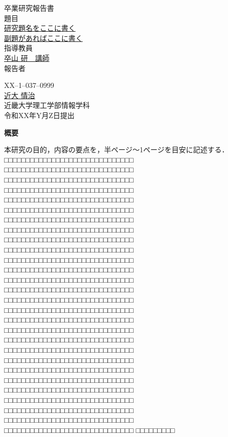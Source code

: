 \documentclass{jsarticle}
\begin{document}
\pagestyle{empty}

\begin{center}
\vspace*{1cm}
\large
{\LARGE 卒業研究報告書}\\
\vspace*{0.8cm}
題目\\
\vspace*{1cm}
{\Huge \underline{研究題名をここに書く}}\\
\vspace{3mm}
{\LARGE \underline{副題があればここに書く}}\\

\vspace*{3cm}
指導教員\\
\vspace*{0.3cm}
\underline{\LARGE 卒山 研　講師}\\
\vspace*{3cm}
報告者\\
\vspace*{0.3cm}

{XX--1--037--0999}\\
\vspace*{0.3cm}
\underline{\Huge 近大 情治}\\
\vspace*{0.5cm}
近畿大学理工学部情報学科\\
\vspace*{2cm}
令和XX年Y月Z日提出\\
\end{center}

\newpage
\normalsize


\clearpage
\begin{center}
{\bf \Large 概要}
\end{center} 

本研究の目的，内容の要点を，半ページ～1ページを目安に記述する．
□□□□□□□□□□□□□□□□□□□□□□□□□□□□□□
□□□□□□□□□□□□□□□□□□□□□□□□□□□□□□
□□□□□□□□□□□□□□□□□□□□□□□□□□□□□□
□□□□□□□□□□□□□□□□□□□□□□□□□□□□□□
□□□□□□□□□□□□□□□□□□□□□□□□□□□□□□
□□□□□□□□□□□□□□□□□□□□□□□□□□□□□□
□□□□□□□□□□□□□□□□□□□□□□□□□□□□□□
□□□□□□□□□□□□□□□□□□□□□□□□□□□□□□
□□□□□□□□□□□□□□□□□□□□□□□□□□□□□□
□□□□□□□□□□□□□□□□□□□□□□□□□□□□□□
□□□□□□□□□□□□□□□□□□□□□□□□□□□□□□
□□□□□□□□□□□□□□□□□□□□□□□□□□□□□□
□□□□□□□□□□□□□□□□□□□□□□□□□□□□□□
□□□□□□□□□□□□□□□□□□□□□□□□□□□□□□
□□□□□□□□□□□□□□□□□□□□□□□□□□□□□□
□□□□□□□□□□□□□□□□□□□□□□□□□□□□□□
□□□□□□□□□□□□□□□□□□□□□□□□□□□□□□
□□□□□□□□□□□□□□□□□□□□□□□□□□□□□□
□□□□□□□□□□□□□□□□□□□□□□□□□□□□□□
□□□□□□□□□□□□□□□□□□□□□□□□□□□□□□
□□□□□□□□□□□□□□□□□□□□□□□□□□□□□□
□□□□□□□□□□□□□□□□□□□□□□□□□□□□□□
□□□□□□□□□□□□□□□□□□□□□□□□□□□□□□
□□□□□□□□□□□□□□□□□□□□□□□□□□□□□□
□□□□□□□□□□□□□□□□□□□□□□□□□□□□□□
□□□□□□□□□□□□□□□□□□□□□□□□□□□□□□
□□□□□□□□□□□□□□□□□□□□□□□□□□□□□□
□□□□□□□□□□□□□□□□□□□□□□□□□□□□□□
□□□□□□□□□
\end{document}
